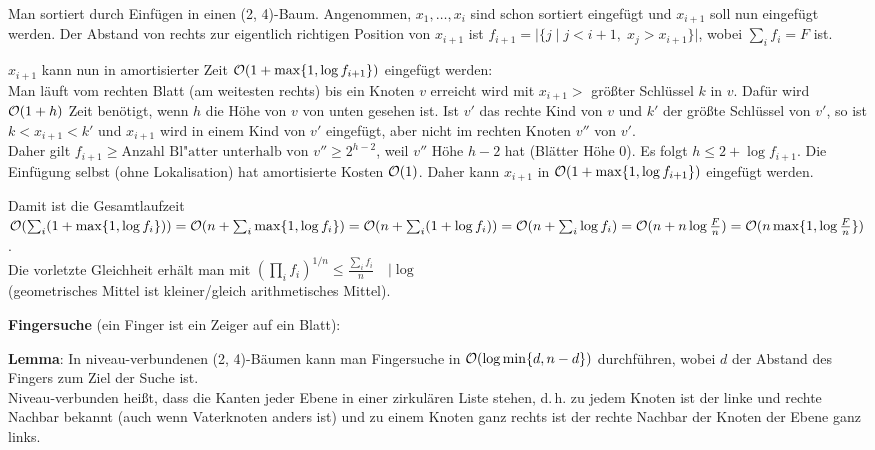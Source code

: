 \begin{Beweis}
    Man sortiert durch Einfügen in einen (2, 4)-Baum.
    Angenommen, $x_1, \dotsc, x_i$ sind schon sortiert eingefügt
    und $x_{i+1}$ soll nun eingefügt werden.
    Der Abstand von rechts zur eigentlich richtigen Position von $x_{i+1}$
    ist $f_{i+1} = |\{j \;|\; j < i + 1,\; x_j > x_{i+1}\}|$, wobei
    $\sum_i f_i = F$ ist.
    
    $x_{i+1}$ kann nun in amortisierter Zeit
    $\mathcal{O}(1 + \max\{1, \log f_{i+1}\})$ eingefügt werden: \\
    Man läuft vom rechten Blatt (am weitesten rechts) bis ein Knoten
    $v$ erreicht wird mit $x_{i+1} >$ größter Schlüssel $k$ in $v$.
    Dafür wird $\mathcal{O}(1 + h)$ Zeit benötigt, wenn $h$ die Höhe von $v$
    von unten gesehen ist.
    Ist $v'$ das rechte Kind von $v$ und $k'$ der größte Schlüssel von
    $v'$, so ist $k < x_{i+1} < k'$ und $x_{i+1}$ wird in einem Kind
    von $v'$ eingefügt, aber nicht im rechten Knoten $v''$ von $v'$. \\
    Daher gilt $f_{i+1} \ge \text{Anzahl Bl"atter unterhalb von } v''
    \ge 2^{h-2}$, weil $v''$ Höhe $h - 2$ hat (Blätter Höhe $0$).
    Es folgt $h \le 2 + \log f_{i+1}$.
    Die Einfügung selbst (ohne Lokalisation) hat amortisierte Kosten
    $\mathcal{O}(1)$.
    Daher kann $x_{i+1}$ in $\mathcal{O}(1 + \max\{1, \log f_{i+1}\})$ eingefügt
    werden.
    
    Damit ist die Gesamtlaufzeit
    $\mathcal{O}(\sum_i (1 + \max\{1, \log f_i\}))
    = \mathcal{O}(n + \sum_i \max\{1, \log f_i\}) \\
    = \mathcal{O}(n + \sum_i (1 + \log f_i))
    = \mathcal{O}(n + \sum_i \log f_i)
    = \mathcal{O}(n + n \log \frac{F}{n})
    = \mathcal{O}(n \max\{1, \log \frac{F}{n}\})$. \\
    Die vorletzte Gleichheit erhält man mit
    $(\prod_i f_i)^{1/n} \le \frac{\sum_i f_i}{n} \quad |\log$ \\
    (geometrisches Mittel ist kleiner/gleich arithmetisches Mittel).
\end{Beweis}

\linie

\textbf{Fingersuche}
(ein Finger ist ein Zeiger auf ein Blatt):

\textbf{Lemma}:
In niveau-verbundenen (2, 4)-Bäumen kann man Fingersuche in
$\mathcal{O}(\log \min\{d, n - d\})$ durchführen, wobei $d$ der Abstand des
Fingers zum Ziel der Suche ist. \\
Niveau-verbunden heißt, dass die Kanten jeder Ebene in einer zirkulären
Liste stehen, d.\,h. zu jedem Knoten ist der linke und rechte Nachbar bekannt
(auch wenn Vaterknoten anders ist) und zu einem Knoten ganz
rechts ist der rechte Nachbar der Knoten der Ebene ganz links.

